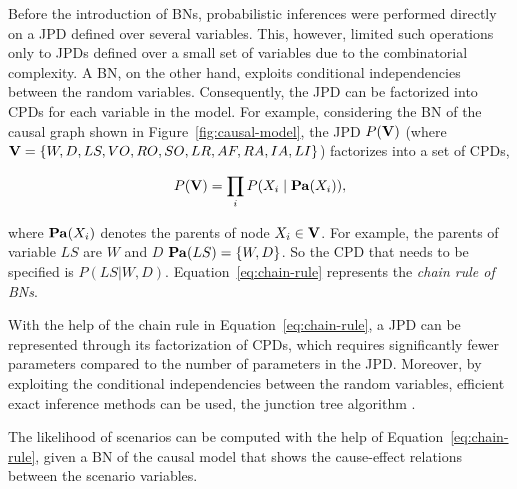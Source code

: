 \documentclass[conference]{IEEEtran}
\begin{document}
Before the introduction of BNs, probabilistic inferences were performed directly on a JPD defined over several variables. This, however, limited such operations only to JPDs defined over a small set of variables due to the combinatorial complexity. A BN, on the other hand, exploits conditional independencies between the random variables. Consequently, the JPD can be factorized into CPDs for each variable in the model. 
For example, considering the BN of the causal graph shown in Figure~\ref{fig:causal-model}, the JPD $P({\mathbf{V}})$ (where ${\mathbf{V}} = \{W, D, LS, VO, RO, SO, LR, AF, RA, IA, LI\}$) factorizes into a set of CPDs, \ie


\begin{eqnarray}
P(\VV) = \prod_i P(X_i\mid \Pa(X_i)),  \label{eq:chain-rule}
\end{eqnarray}

\noindent
where ${\mathbf{Pa}}(X_i)$ denotes the parents of node $X_i \in {\mathbf{V}}$. For example, the parents of variable $LS$ are $W$ and $D$ \ie ${\mathbf{Pa}}(LS) = \{W,D\}$. So the CPD that needs to be specified is $P(LS| W,D)$. Equation~\ref{eq:chain-rule} represents the {\em chain rule of BNs}.

% 


With the help of the chain rule in Equation~\ref{eq:chain-rule}, a JPD can be represented through its factorization of CPDs, which requires significantly fewer parameters compared to the number of parameters in the JPD. Moreover, by exploiting the conditional independencies between the random variables, efficient exact inference methods can be used, \eg the junction tree algorithm \cite{cowell99bn}.

The likelihood of scenarios can be computed with the help of Equation~\ref{eq:chain-rule}, given a BN of the causal model that shows the cause-effect relations between the scenario variables. 


\end{document}

